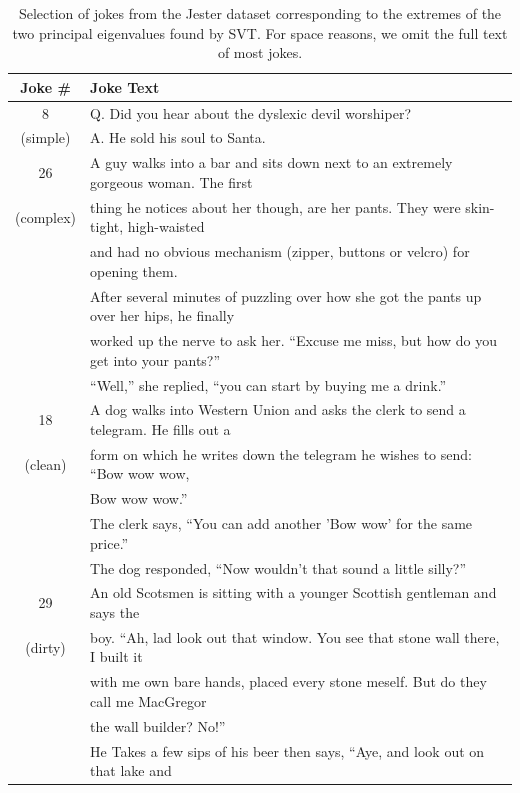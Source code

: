 \documentclass{article} %
\begin{document}
\begin{table} [h]
  \caption{Selection of jokes from the Jester dataset corresponding to
    the extremes of the two principal eigenvalues found by SVT. For space reasons, we omit the full text of most jokes.}
\begin{tabular}{c | l}
\hline \hline
Joke \# & Joke Text \\ \hline
  8     & Q. Did you hear about the dyslexic devil worshiper? \\
(simple)& A. He sold his soul to Santa.\\ \hline
  26 & A guy walks into a bar and sits down next to an extremely
       gorgeous woman. The first \\
(complex)& thing he notices about her though, are her pants. They were
       skin-tight, high-waisted \\
     & and had no obvious mechanism (zipper, buttons or velcro) for opening them. \\
     & After several minutes of puzzling over how she got the pants up over
       her hips, he finally \\
     & worked up the nerve to ask her. ``Excuse me miss, but how do you get into your pants?'' \\ 
     & ``Well,'' she replied, ``you can start by buying me a drink.''\\ \hline
  18 & A dog walks into Western Union and asks the clerk to send a
       telegram. He fills out a \\
(clean)& form on which he writes down the telegram he wishes to send:
       ``Bow wow wow, \\
     &  Bow wow wow.'' \\
     & The clerk says, ``You can add another 'Bow wow' for the same
       price.''\\
     & The dog responded, ``Now wouldn't that sound a little silly?''\\ \hline
  29 & An old Scotsmen is sitting with a younger Scottish gentleman
       and says the \\
(dirty)&  boy. ``Ah, lad look out that window. You see that stone wall
       there, I built it \\
     & with me own bare hands, placed every stone meself. But do they
       call me MacGregor \\
     & the wall builder? No!'' \\
     & He Takes a few sips of his beer then says, ``Aye, and look out
       on that lake and \\

\end{tabular}
\end{table}
\end{document}
